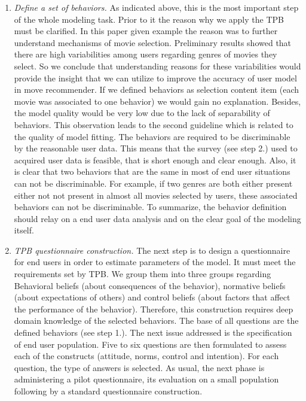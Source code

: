 \documentclass{llncs}
\begin{document}
\begin{enumerate}
 \item {\it Define a set of behaviors.} As indicated above, this is the most important step of the whole modeling task. Prior to it the reason why we apply the TPB must be clarified. In this paper given example the reason was to further understand mechanisms of movie selection. Preliminary results showed that there are high variabilities among users regarding genres of movies they select. So we conclude that understanding reasons for these variabilities would provide the insight that we can utilize to improve the accuracy of user model in move recommender. If we defined behaviors as selection content item (each movie was associated to one behavior) we would gain no explanation. Besides, the model quality would be very low due to the lack of separability of behaviors. This observation leads to the second guideline which is related to the quality of model fitting. The behaviors are required to be discriminable by the reasonable user data. This means that the survey (see step 2.) used to acquired user data is feasible, that is short enough and clear enough. Also, it is clear that two behaviors that are the same in most of end user situations can not be discriminable. For example, if two genres are both either present either not not present in almost all movies selected by users, these associated behaviors can not be discriminable. To summarize, the behavior definition should relay on a end user data analysis and on the clear goal of the modeling itself.  
 \item {\it TPB questionnaire construction.} The next step is to design a questionnaire for end users in order to estimate parameters of the model. It must meet the requirements set by TPB. We group them into three groups regarding Behavioral beliefs (about consequences of the behavior), normative beliefs (about expectations of others) and control beliefs (about factors that affect the performance of the behavior). Therefore, this construction requires deep domain knowledge of the selected behaviors. The base of all questions are the defined behaviors (see step 1.). The next issue addressed is the specification of end user population. Five to six questions are then formulated to assess each of the constructs (attitude, norms, control and intention). For each question, the type of answers is selected. As usual, the next phase is administering a pilot questionnaire, its evaluation on a small population following by a standard questionnaire construction.

\end{enumerate}
\end{document}
